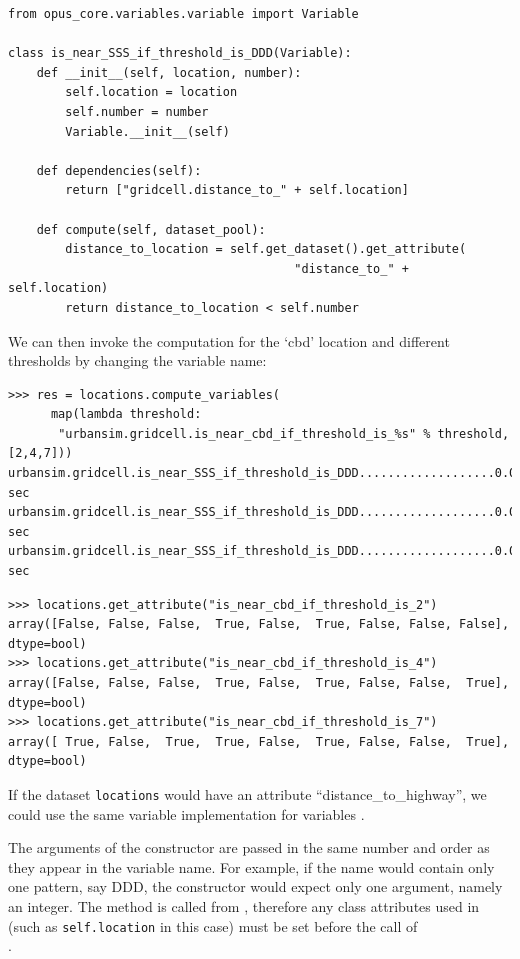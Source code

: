 \variablesindex
\numpyindex
\begin{verbatim}
from opus_core.variables.variable import Variable

class is_near_SSS_if_threshold_is_DDD(Variable):
    def __init__(self, location, number):
        self.location = location
        self.number = number
        Variable.__init__(self)

    def dependencies(self):
        return ["gridcell.distance_to_" + self.location]

    def compute(self, dataset_pool):
        distance_to_location = self.get_dataset().get_attribute(
                                        "distance_to_" + self.location)
        return distance_to_location < self.number
\end{verbatim}
We can then invoke the computation for the `cbd' location and different
thresholds by changing the variable name:
\begin{verbatim}
>>> res = locations.compute_variables(
      map(lambda threshold:
       "urbansim.gridcell.is_near_cbd_if_threshold_is_%s" % threshold, [2,4,7]))
urbansim.gridcell.is_near_SSS_if_threshold_is_DDD...................0.0 sec
urbansim.gridcell.is_near_SSS_if_threshold_is_DDD...................0.0 sec
urbansim.gridcell.is_near_SSS_if_threshold_is_DDD...................0.0 sec
\end{verbatim}

\attributesindex
\begin{verbatim}
>>> locations.get_attribute("is_near_cbd_if_threshold_is_2")
array([False, False, False,  True, False,  True, False, False, False], dtype=bool)
>>> locations.get_attribute("is_near_cbd_if_threshold_is_4")
array([False, False, False,  True, False,  True, False, False,  True], dtype=bool)
>>> locations.get_attribute("is_near_cbd_if_threshold_is_7")
array([ True, False,  True,  True, False,  True, False, False,  True], dtype=bool)
\end{verbatim}

If the dataset \datasetindex \verb|locations| would have an attribute \attributesindex
``distance_to_highway'', we
could use the same variable \variablesindex implementation for variables \variablesindex
{}.

The arguments of the constructor are passed in the same number and order as
they appear in the variable name. For example, if the name would contain only
one pattern, say DDD, the constructor would expect only one argument, namely
an integer. The method  is called from
, therefore any class attributes used in
 (such as \verb|self.location| in this case) must be set
before the call of \\
.

